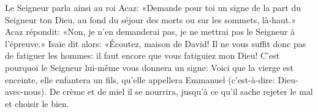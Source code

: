 Le Seigneur parla ainsi au roi Acaz:
	«Demande pour toi un signe de la part du Seigneur ton Dieu,
	au fond du séjour des morts ou sur les sommets, là-haut.»
Acaz répondit: «Non, je n’en demanderai pas,
	je ne mettrai pas le Seigneur à l’épreuve.»
Isaïe dit alors: «Écoutez, maison de David!
	Il ne vous suffit donc pas de fatiguer les hommes:
	il faut encore que vous fatiguiez mon Dieu!
	C’est pourquoi le Seigneur lui-même vous donnera un signe:
	Voici que la vierge est enceinte,
	elle enfantera un fils, qu’elle appellera Emmanuel
	(c’est-à-dire: Dieu-avec-nous).
De crème et de miel il se nourrira,
	jusqu’à ce qu’il sache rejeter le mal et choisir le bien.
